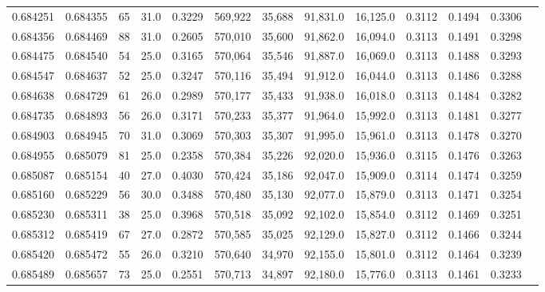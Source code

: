 \begin{tabular}{rrrrrrrrrrrrr}
0.684251 & 0.684355 &    65 & 31.0 &                                     0.3229 & 569,922 &  35,688 &  91,831.0 &  16,125.0 & 0.3112 & 0.1494 & 0.3306 \\
0.684356 & 0.684469 &    88 & 31.0 &                                     0.2605 & 570,010 &  35,600 &  91,862.0 &  16,094.0 & 0.3113 & 0.1491 & 0.3298 \\
0.684475 & 0.684540 &    54 & 25.0 &                                     0.3165 & 570,064 &  35,546 &  91,887.0 &  16,069.0 & 0.3113 & 0.1488 & 0.3293 \\
0.684547 & 0.684637 &    52 & 25.0 &                                     0.3247 & 570,116 &  35,494 &  91,912.0 &  16,044.0 & 0.3113 & 0.1486 & 0.3288 \\
0.684638 & 0.684729 &    61 & 26.0 &                                     0.2989 & 570,177 &  35,433 &  91,938.0 &  16,018.0 & 0.3113 & 0.1484 & 0.3282 \\
0.684735 & 0.684893 &    56 & 26.0 &                                     0.3171 & 570,233 &  35,377 &  91,964.0 &  15,992.0 & 0.3113 & 0.1481 & 0.3277 \\
0.684903 & 0.684945 &    70 & 31.0 &                                     0.3069 & 570,303 &  35,307 &  91,995.0 &  15,961.0 & 0.3113 & 0.1478 & 0.3270 \\
0.684955 & 0.685079 &    81 & 25.0 &                                     0.2358 & 570,384 &  35,226 &  92,020.0 &  15,936.0 & 0.3115 & 0.1476 & 0.3263 \\
0.685087 & 0.685154 &    40 & 27.0 &                                     0.4030 & 570,424 &  35,186 &  92,047.0 &  15,909.0 & 0.3114 & 0.1474 & 0.3259 \\
0.685160 & 0.685229 &    56 & 30.0 &                                     0.3488 & 570,480 &  35,130 &  92,077.0 &  15,879.0 & 0.3113 & 0.1471 & 0.3254 \\
0.685230 & 0.685311 &    38 & 25.0 &                                     0.3968 & 570,518 &  35,092 &  92,102.0 &  15,854.0 & 0.3112 & 0.1469 & 0.3251 \\
0.685312 & 0.685419 &    67 & 27.0 &                                     0.2872 & 570,585 &  35,025 &  92,129.0 &  15,827.0 & 0.3112 & 0.1466 & 0.3244 \\
0.685420 & 0.685472 &    55 & 26.0 &                                     0.3210 & 570,640 &  34,970 &  92,155.0 &  15,801.0 & 0.3112 & 0.1464 & 0.3239 \\
0.685489 & 0.685657 &    73 & 25.0 &                                     0.2551 & 570,713 &  34,897 &  92,180.0 &  15,776.0 & 0.3113 & 0.1461 & 0.3233 \\

\end{tabular}
